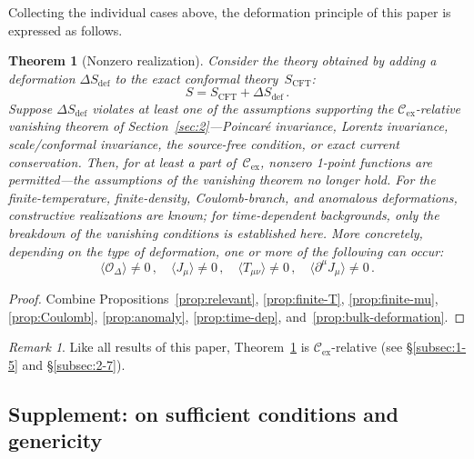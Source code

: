 \documentclass[
  aps,
  prd,
  preprint,
  groupedaddress,
  nofootinbib,
  longbibliography
]{revtex4-2}
\newtheorem{theorem}[definition]{Theorem}
\theoremstyle{remark}
\newtheorem{remark}[definition]{Remark}
\newcommand{\Cex}{\mathcal{C}_{\mathrm{ex}}}
\begin{document}
Collecting the individual cases above, the deformation principle
of this paper is expressed as follows.

\begin{theorem}[Nonzero realization]\label{thm:nonzero}
Consider the theory obtained by adding a deformation
$\Delta S_{\mathrm{def}}$ to the exact conformal
theory~$S_{\mathrm{CFT}}$:
\begin{equation}\label{eq:deformed-theory}
  S = S_{\mathrm{CFT}} + \Delta S_{\mathrm{def}}\,.
\end{equation}
Suppose $\Delta S_{\mathrm{def}}$ violates at least one of
the assumptions supporting the $\Cex$-relative vanishing
theorem of Section~\ref{sec:2}---Poincar\'e invariance,
Lorentz invariance, scale/conformal invariance, the source-free
condition, or exact current conservation.
Then, for at least a part of~$\Cex$, nonzero 1-point functions
are permitted---the assumptions of the vanishing theorem no
longer hold.
For the finite-temperature, finite-density, Coulomb-branch,
and anomalous deformations, constructive realizations are
known; for time-dependent backgrounds, only the breakdown
of the vanishing conditions is established here.
More concretely, depending on the type of deformation, one or
more of the following can occur:
\begin{equation}\label{eq:nonzero-list}
  \langle\mathcal{O}_\Delta\rangle\neq 0\,,\quad
  \langle J_\mu\rangle\neq 0\,,\quad
  \langle T_{\mu\nu}\rangle\neq 0\,,\quad
  \langle\partial^\mu J_\mu\rangle\neq 0\,.
\end{equation}
\end{theorem}

\begin{proof}
Combine
Propositions~\ref{prop:relevant},
\ref{prop:finite-T},
\ref{prop:finite-mu},
\ref{prop:Coulomb},
\ref{prop:anomaly},
\ref{prop:time-dep},
and~\ref{prop:bulk-deformation}.
\end{proof}

\begin{remark}\label{rem:thm-nonzero-scope}
Like all results of this paper, Theorem~\ref{thm:nonzero} is
$\Cex$-relative (see \S\ref{subsec:1-5} and
\S\ref{subsec:2-7}).
\end{remark}

\subsection{Supplement: on sufficient conditions and genericity}%
  \label{subsec:3-10}
\end{document}
